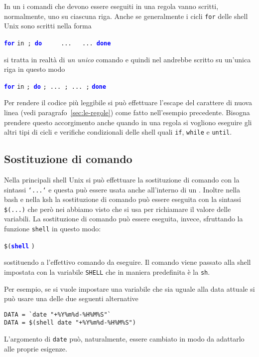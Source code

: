 In un  i comandi che devono essere eseguiti in una regola
vanno scritti, normalmente, uno su ciascuna riga.  Anche se generalmente i cicli
\texttt{for} delle shell Unix sono scritti nella forma
\begin{sintassi} \obeylines{}
  \small \texttt{\textcolor{blue}{\textbf{for}}}  \texttt{in}\
  \texttt{; \textcolor{blue}{\textbf{do}}}
  \texttt{\ \ }
  \texttt{\ \ ...
    \ \ ...
    \textcolor{blue}{\textbf{done}}}
\end{sintassi}
si tratta in realtà di \emph{un unico} comando e quindi nel 
andrebbe scritto su un'unica riga in questo modo
\begin{sintassi}
  \small \texttt{\textcolor{blue}{\textbf{for}}}  \texttt{in}
  \meta{elenco}\texttt{; \textcolor{blue}{\textbf{do}}} \meta{comandi}
  \texttt{; ... ; ... ;} \texttt{\textcolor{blue}{\textbf{done}}}
\end{sintassi}
Per rendere il codice più leggibile si può effettuare l'escape del carattere di
nuova linea (vedi paragrafo~\ref{sec:le-regole}) come fatto nell'esempio
precedente.  Bisogna prendere questo accorgimento anche quando in una regola si
vogliono eseguire gli altri tipi di cicli e verifiche condizionali delle shell
quali \texttt{if}, \texttt{while} e \texttt{until}.

\subsection{Sostituzione di comando}
\label{sec:sostituzione-comando}

Nella principali shell Unix si può effettuare la sostituzione di comando con la
sintassi \texttt{`...`} e questa può essere usata anche all'interno di un
\filestyle{Makefile}.  Inoltre nella bash e nella ksh la sostituzione di comando
può essere eseguita con la sintassi \texttt{\$(...)} che però nei
\filestyle{Makefile} abbiamo visto che si usa per richiamare il valore delle
variabili.  La sostituzione di comando può essere eseguita, invece, sfruttando
la funzione \texttt{shell} in questo modo:
\begin{sintassi}
  \small \texttt{\$(\textcolor{blue}{\textbf{shell}}} \texttt{)}
\end{sintassi}
sostituendo a  l'effettivo comando da eseguire.  Il comando viene
passato alla shell impostata con la variabile \texttt{SHELL} che in maniera
predefinita è la \texttt{sh}.

Per esempio, se si vuole impostare una variabile che sia uguale alla data
attuale si può usare una delle due seguenti alternative
\begin{lstlisting}
DATA = `date "+%Y%m%d-%H%M%S"`
DATA = $(shell date "+%Y%m%d-%H%M%S")
\end{lstlisting} %
L'argomento di \texttt{date} può, naturalmente, essere cambiato in modo da
adattarlo alle proprie esigenze.

